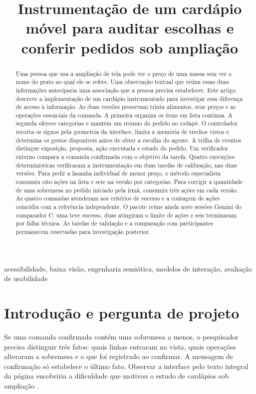 
\title{Instrumentação de um cardápio móvel para auditar escolhas e conferir pedidos sob ampliação}
\author{\groupauthors}

\maketitle
\begin{abstract}
Uma pessoa que usa a ampliação de tela pode ver o preço de uma massa sem ver o nome do prato ao qual ele se refere. Uma observação textual que reúna essas duas informações anteciparia uma associação que a pessoa precisa estabelecer. Este artigo descreve a implementação de um cardápio instrumentado para investigar essa diferença de acesso à informação. As duas versões preservam trinta alimentos, seus preços e as operações essenciais da comanda. A primeira organiza os itens em lista contínua. A segunda oferece categorias e mantém um resumo do pedido no rodapé. O controlador recorta os signos pela geometria da interface, limita a memória de trechos vistos e determina os gestos disponíveis antes de obter a escolha do agente. A trilha de eventos distingue exposição, proposta, ação executada e estado do pedido. Um verificador externo compara a comanda confirmada com o objetivo da tarefa. Quatro execuções determinísticas verificaram a instrumentação em duas tarefas de calibração, nas duas versões. Para pedir a lasanha individual de menor preço, o método especialista consumiu oito ações na lista e sete na versão por categorias. Para corrigir a quantidade de uma sobremesa no pedido iniciado pela irmã, consumiu três ações em cada versão. As quatro comandas atenderam aos critérios de sucesso e a contagem de ações coincidiu com a referência independente. O pacote reúne ainda nove sessões Gemini do comparador C: uma teve sucesso, duas atingiram o limite de ações e seis terminaram por falha técnica. As tarefas de validação e a comparação com participantes permanecem reservadas para investigação posterior.
\end{abstract}
\begin{IEEEkeywords}acessibilidade, baixa visão, engenharia semiótica, modelos de interação, avaliação de usabilidade\end{IEEEkeywords}

\section{Introdução e pergunta de projeto}
Se uma comanda confirmada contém uma sobremesa a menos, o pesquisador precisa distinguir três fatos: quais linhas entraram na vista, quais operações alteraram a sobremesa e o que foi registrado ao confirmar. A mensagem de confirmação só estabelece o último fato. Observar a interface pelo texto integral da página encobriria a dificuldade que motivou o estudo de cardápios sob ampliação \cite{fase1,pesquisa}.

